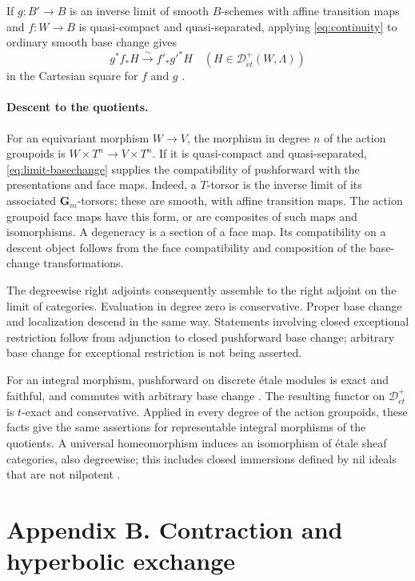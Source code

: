 \documentclass[11pt,a4paper]{article}
\newcommand{\Gm}{\mathbf G_m}
\newcommand{\Det}{\mathcal D_{\acute et}}
\theoremstyle{notes}
\renewcommand{\theequation}{8.\arabic{equation}}
\renewcommand{\theHequation}{8.\arabic{equation}}
\begin{document}
If $g:B'\to B$ is an inverse limit of smooth $B$-schemes with affine transition maps and $f:W\to B$ is quasi-compact and quasi-separated, applying \eqref{eq:continuity} to ordinary smooth base change gives
\begin{equation}\label{eq:limit-basechange}
g^*f_*H\xrightarrow{\sim}f'_*g'^*H
\quad(H\in\Det^+(W,\Lambda))
\end{equation}
in the Cartesian square for $f$ and $g$ \cite[Tag 0F09]{Stacks}.

\paragraph{Descent to the quotients.}
For an equivariant morphism $W\to V$, the morphism in degree $n$ of the action groupoids is $W\times T^n\to V\times T^n$. If it is quasi-compact and quasi-separated, \eqref{eq:limit-basechange} supplies the compatibility of pushforward with the presentations and face maps. Indeed, a $T$-torsor is the inverse limit of its associated $\Gm$-torsors; these are smooth, with affine transition maps. The action groupoid face maps have this form, or are composites of such maps and isomorphisms. A degeneracy is a section of a face map. Its compatibility on a descent object follows from the face compatibility and composition of the base-change transformations.

The degreewise right adjoints consequently assemble to the right adjoint on the limit of categories. Evaluation in degree zero is conservative. Proper base change and localization descend in the same way. Statements involving closed exceptional restriction follow from adjunction to closed pushforward base change; arbitrary base change for exceptional restriction is not being asserted.

For an integral morphism, pushforward on discrete étale modules is exact and faithful, and commutes with arbitrary base change \cite[Tags 04C2 and 0EYP]{Stacks}. The resulting functor on $\Det^+$ is $t$-exact and conservative. Applied in every degree of the action groupoids, these facts give the same assertions for representable integral morphisms of the quotients. A universal homeomorphism induces an isomorphism of étale sheaf categories, also degreewise; this includes closed immersions defined by nil ideals that are not nilpotent \cite[Tag 04DZ]{Stacks}.

\section*{Appendix B. Contraction and hyperbolic exchange}
\setcounter{section}{2}\setcounter{blem}{0}
\renewcommand{\theblem}{B.\arabic{blem}}
\renewcommand{\theequation}{B.\arabic{equation}}
\renewcommand{\theHequation}{B.\arabic{equation}}\setcounter{equation}{0}
\end{document}
